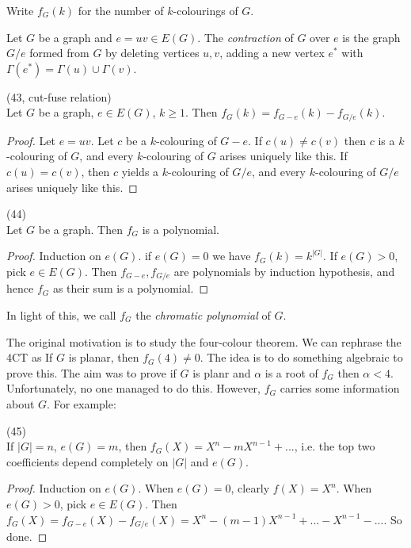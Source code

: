 \documentclass[a4paper]{article}
\begin{document}
Write $f_G(k)$ for the number of $k$-colourings of $G$.

\begin{defi}
Let $G$ be a graph and $e=uv \in E(G)$. The \emph{contraction} of $G$ over $e$ is the graph $G/e$ formed from $G$ by deleting vertices $u,v$, adding a new vertex $e^*$ with $\Gamma(e^*) = \Gamma(u)  \cup \Gamma(v)$.
\end{defi}

\begin{thm} (43, cut-fuse relation)\\
Let $G$ be a graph, $e \in E(G)$, $k \geq 1$. Then $f_G(k) = f_{G-e}(k) - f_{G/e}(k)$.
\begin{proof}
Let $e=uv$. Let $c$ be a $k$-colouring of $G-e$. If $c(u) \neq c(v)$ then $c$ is a $k$-colouring of $G$, and every $k$-colouring of $G$ arises uniquely like this. If $c(u) = c(v)$, then $c$ yields a $k$-colouring of $G/e$, and every $k$-colouring of $G/e$ arises uniquely like this.
\end{proof}
\end{thm}

\begin{coro} (44)\\
Let $G$ be a graph. Then $f_G$ is a polynomial.
\begin{proof}
Induction on $e(G)$. if $e(G) = 0$ we have $f_G(k) = k^{|G|}$. If $e(G) > 0$, pick $e \in E(G)$. Then $f_{G-e},f_{G/e}$ are polynomials by induction hypothesis, and hence $f_G$ as their sum is a polynomial.
\end{proof}
\end{coro}

In light of this, we call $f_G$ the \emph{chromatic polynomial} of $G$.

The original motivation is to study the four-colour theorem. We can rephrase the 4CT as If $G$ is planar, then $f_G(4) \neq 0$. The idea is to do something algebraic to prove this. The aim was to prove if $G$ is planr and $\alpha$ is a root of $f_G$ then $\alpha<4$. Unfortunately, no one managed to do this. However, $f_G$ carries some information about $G$. For example:

\begin{coro} (45)\\
If $|G| = n$, $e(G) = m$, then $f_G(X) = X^n-mX^{n-1}+...$, i.e. the top two coefficients depend completely on $|G|$ and $e(G)$.
\begin{proof}
Induction on $e(G)$. When $e(G) = 0$, clearly $f(X) = X^n$. When $e(G) > 0$, pick $e \in E(G)$. Then $f_G(X) = f_{G-e}(X) - f_{G/e}(X) = X^n - (m-1)X^{n-1}+... - X^{n-1}-...$. So done.
\end{proof}
\end{coro}
\end{document}
